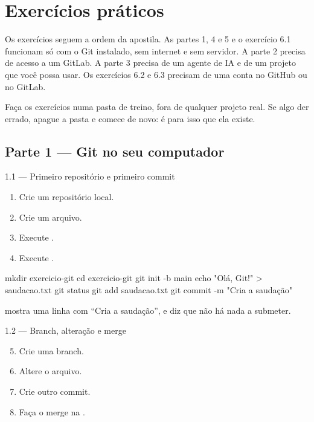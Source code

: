 \chapter{Exercícios práticos}
\label{cap:exercicios}

Os exercícios seguem a ordem da apostila. As partes 1, 4 e 5 e o exercício 6.1 funcionam só com o Git instalado, sem internet e sem servidor. A parte 2 precisa de acesso a um GitLab. A parte 3 precisa de um agente de IA e de um projeto que você possa usar. Os exercícios 6.2 e 6.3 precisam de uma conta no GitHub ou no GitLab.

\begin{dica}
Faça os exercícios numa pasta de treino, fora de qualquer projeto real. Se algo der errado, apague a pasta e comece de novo: é para isso que ela existe.
\end{dica}

\section{Parte 1 — Git no seu computador}

\begin{exercicio}{1.1 — Primeiro repositório e primeiro commit}
\begin{enumerate}
  \item Crie um repositório local.
  \item Crie um arquivo.
  \item Execute .
  \item Execute .
\end{enumerate}
\end{exercicio}

\begin{terminal}
mkdir exercicio-git
cd exercicio-git
git init -b main
echo "Olá, Git!" > saudacao.txt
git status
git add saudacao.txt
git commit -m "Cria a saudação"
\end{terminal}

\begin{verifique}
 mostra uma linha com \enquote{Cria a saudação}, e  diz que não há nada a submeter.
\end{verifique}

\begin{exercicio}{1.2 — Branch, alteração e merge}
\begin{enumerate}\setcounter{enumi}{4}
  \item Crie uma branch.
  \item Altere o arquivo.
  \item Crie outro commit.
  \item Faça o merge na .
\end{enumerate}
\end{exercicio}

